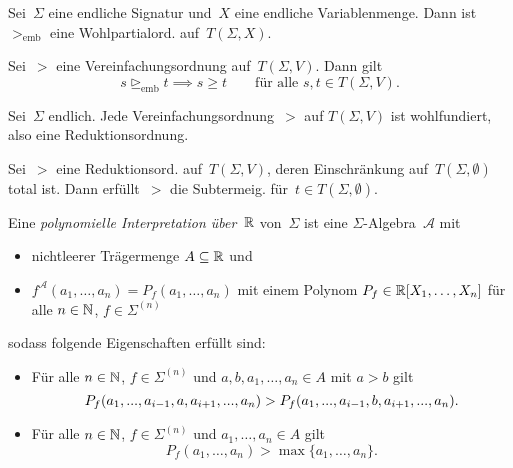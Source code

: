 \documentclass{cheat-sheet}
\renewcommand{\Alg}{\mathcal{A}} %
\newcommand{\emb}{\trianglerighteq_\text{emb}} %
\newcommand{\strictlyEmb}{>_\text{emb}} %
\begin{document}

\begin{thm}
  Sei~$\Sigma$ eine endliche Signatur und~$X$ eine endliche Variablenmenge.
  Dann ist ${\strictlyEmb}$ eine Wohlpartialord. auf~$T(\Sigma, X)$.
\end{thm}

\begin{lem}
  Sei~${>}$ eine Vereinfachungsordnung auf~$T(\Sigma, V)$.
  Dann gilt
  \[
    s \emb t \implies s \geq t \qquad
    \text{für alle $s, t \in T(\Sigma, V)$.}
  \]
\end{lem}

\begin{thm}
  Sei~$\Sigma$ endlich.
  Jede Vereinfachungsordnung~${>}$ auf $T(\Sigma, V)$ ist wohlfundiert, also eine Reduktionsordnung.
\end{thm}

\begin{prop}
  Sei~${>}$ eine Reduktionsord. auf~$T(\Sigma, V)$, deren Einschränkung auf~$T(\Sigma, \emptyset)$ total ist.
  Dann erfüllt~${>}$ die Subtermeig. für~$t \in T(\Sigma, \emptyset)$.
\end{prop}


\begin{defn}
  Eine \emph{polynomielle Interpretation über~$\mathbb{R}$} von~$\Sigma$ ist eine $\Sigma$-Algebra~$\Alg$ mit
  \begin{itemize}
    \item nichtleerer Trägermenge $A \subseteq \mathbb{R}$ und
    \item $f^\Alg(a_1, \ldots, a_n) = P_f(a_1, \ldots, a_n)$ mit einem Polynom $P_f \in \mathbb{R}[X_1, \ldots, X_n]$ für alle $n \in \mathbb{N}$, $f \in \Sigma^{(n)}$
  \end{itemize}
  sodass folgende Eigenschaften erfüllt sind:
  \begin{itemize}
    \item Für alle $n \in \mathbb{N}$, $f \in \Sigma^{(n)}$ und $a, b, a_1, \ldots, a_n \in A$ mit $a > b$ gilt
    \[
      P_f(a_1, ..., a_{i-1}, a, a_{i+1}, ..., a_n) > P_f(a_1, ..., a_{i-1}, b, a_{i+1}, ..., a_n).
    \]
    \item Für alle $n \in \mathbb{N}$, $f \in \Sigma^{(n)}$ und $a_1, \ldots, a_n \in A$ gilt
    \[
      P_f(a_1, \ldots, a_n) > \max \{ a_1, \ldots, a_n \}.
    \]
  \end{itemize}
\end{defn}
\end{document}
